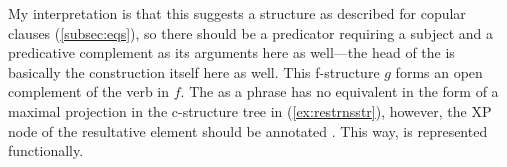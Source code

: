 My interpretation is that this suggests a structure as described for copular
clauses (\autoref{subsec:eqs}), so there should be a  predicator
requiring a subject and a predicative complement as its arguments here as
well---the head of the \XCompl{} is basically the construction itself here as
well. This f-structure $g$ forms an open complement of the verb in $f$. The
\XCompl{} as a phrase has no equivalent in the form of a maximal projection in
the c-structure tree in (\ref{ex:restrnsstr}), however, the XP node of the
resultative element should be annotated \pass{\XCompl{} \Plink}. This way,
\XCompl{} is represented functionally.

